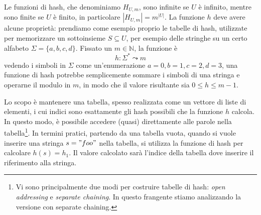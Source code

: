 Le funzioni di hash, che denominiamo $H_{U,m}$, sono infinite se $U$ è infinito, mentre sono finite
se $U$ è finito, in particolare $|H_{U,m}| = m^{|U|}$.
La funzione $h$ deve avere alcune proprietà: prendiamo come esempio proprio le tabelle di hash,
utilizzate per memorizzare un sottoinsieme $S \subseteq U$, per esempio delle stringhe su un certo
alfabeto $\Sigma = \{a, b, c, d\}$. Fissato un $m \in \mathbb{N}$, la funzione è
$$
	h: \Sigma^* \leadsto m
$$
vedendo i simboli in $\Sigma$ come un'enumerazione $a = 0, b = 1, c =2, d = 3$,
una funzione di hash potrebbe semplicemente sommare i simboli di una stringa e
operarne il modulo in $m$, in modo che il valore risultante sia $0 \leq h \le m-1 $.

Lo scopo è mantenere una tabella, spesso realizzata come un vettore di liste di
elementi, i cui indici sono esattamente gli hash possibili che la funzione $h$
calcola. In questo modo, è possibile accedere (quasi) direttamente alle
parole nella tabella\footnote{Vi sono principalmente due modi per costruire
	tabelle di hash: \textit{open addressing} e \textit{separate chaining}.
	In questo frangente stiamo analizzando la versione con separate chaining.}.
In termini pratici, partendo da una tabella vuota, quando
si vuole inserire una stringa $s = "foo"$ nella tabella, si utilizza la funzione
di hash per calcolare $h(s) = h_1$. Il valore calcolato sarà l'indice della
tabella dove inserire il riferimento alla stringa.

